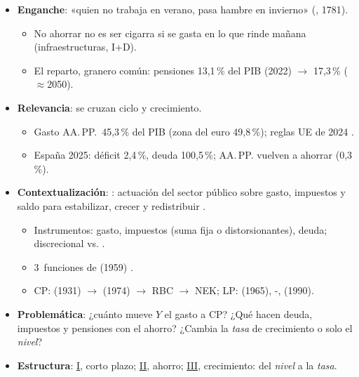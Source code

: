 \documentclass{article}
\begin{document}
\cabecerarepaso
\begin{columnas}

\begin{itemize}
\item \textbf{Enganche}: «quien no trabaja en verano, pasa hambre en invierno» (, 1781).
  \begin{itemize}
  \item No ahorrar no es ser cigarra si se gasta en lo que rinde mañana (infraestructuras, I+D).
  \item El reparto, granero común: pensiones 13,1\,\% del PIB (2022) $\to$ 17,3\,\% ($\approx$2050).
  \end{itemize}
\item \textbf{Relevancia}: se cruzan ciclo y crecimiento.
  \begin{itemize}
  \item Gasto AA.\,PP.\ 45,3\,\% del PIB (zona del euro 49,8\,\%); reglas UE de 2024 .
  \item España 2025: déficit 2,4\,\%, deuda 100,5\,\%; AA.\,PP. vuelven a ahorrar (0,3\,\%).
  \end{itemize}
\item \textbf{Contextualización}: : actuación del sector público sobre gasto, impuestos y saldo para estabilizar, crecer y redistribuir .
  \begin{itemize}
  \item Instrumentos: gasto, impuestos (suma fija o distorsionantes), deuda; discrecional vs.  .
  \item 3~funciones de  (1959) .
  \item CP:  (1931) $\to$  (1974) $\to$ RBC $\to$ NEK; LP:  (1965), -,  (1990).
  \end{itemize}
\item \textbf{Problemática}: ¿cuánto mueve $Y$ el gasto a CP? ¿Qué hacen deuda, impuestos y pensiones con el ahorro? ¿Cambia la \emph{tasa} de crecimiento o solo el \emph{nivel}?
\item \textbf{Estructura}: \hyperref[rep:I]{I}, corto plazo; \hyperref[rep:II]{II}, ahorro; \hyperref[rep:III]{III}, crecimiento: del \emph{nivel} a la \emph{tasa}.
\end{itemize}


\end{columnas}
\end{document}
